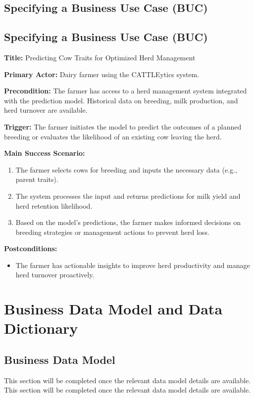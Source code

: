 \documentclass[12pt]{article}
\begin{document}
\subsection{Specifying a Business Use Case (BUC)}
\subsection{Specifying a Business Use Case (BUC)}

\textbf{Title:} Predicting Cow Traits for Optimized Herd Management

\textbf{Primary Actor:} Dairy farmer using the CATTLEytics system.

\textbf{Precondition:} The farmer has access to a herd management system 
integrated with the prediction model. Historical data on breeding, milk 
production, and herd turnover are available.

\textbf{Trigger:} The farmer initiates the model to predict the outcomes of a 
planned breeding or evaluates the likelihood of an existing cow leaving the herd.

\textbf{Main Success Scenario:}
\begin{enumerate}
    \item The farmer selects cows for breeding and inputs the necessary data 
    (e.g., parent traits).
    \item The system processes the input and returns predictions for milk yield 
    and herd retention likelihood.
    \item Based on the model's predictions, the farmer makes informed decisions 
    on breeding strategies or management actions to prevent herd loss.
\end{enumerate}

\textbf{Postconditions:}
\begin{itemize}
    \item The farmer has actionable insights to improve herd productivity and 
    manage herd turnover proactively.
\end{itemize}


\section{Business Data Model and Data Dictionary}
\subsection{Business Data Model}
This section will be completed once the relevant data model details are available.
This section will be completed once the relevant data model details are available.
\end{document}
